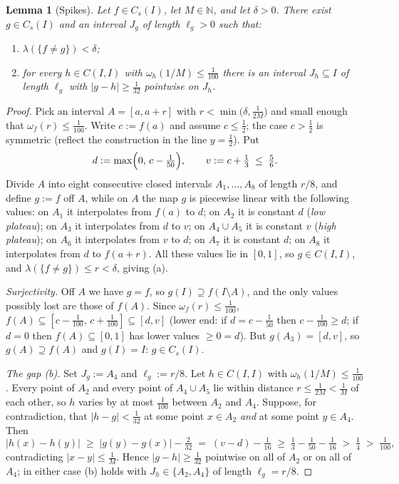 ﻿\documentclass[11pt]{article}
\newtheorem{lemma}[theorem]{Lemma}
\newcommand{\I}{I}
\newcommand{\Cs}{C_s(\I)}
\newcommand{\CI}{C(\I,\I)}
\begin{document}
\begin{lemma}[Spikes]\label{lem:spike}
Let $f\in\Cs$, let $M\in\mathbb N$, and let $\delta>0$.  There exist
$g\in\Cs$ and an interval $J_g$ of length $\ell_g>0$ such that:
\begin{enumerate}
\item[(a)] $\lambda(\{f\ne g\})<\delta$;
\item[(b)] for every $h\in\CI$ with $\omega_h(1/M)\le\tfrac1{100}$ there is an
interval $J_h\subseteq\I$ of length $\ell_g$ with $|g-h|\ge\tfrac1{32}$
\emph{pointwise} on $J_h$.
\end{enumerate}
\end{lemma}

\begin{proof}
Pick an interval $A=[a,a+r]$ with $r<\min\bigl(\delta,\tfrac1{2M}\bigr)$ and small
enough that $\omega_f(r)\le\tfrac1{100}$.  Write $c:=f(a)$ and assume
$c\le\tfrac12$; the case $c>\tfrac12$ is symmetric (reflect the construction in
the line $y=\tfrac12$).  Put
\[
d:=\max\Bigl(0,\,c-\tfrac1{50}\Bigr),
\qquad
v:=c+\tfrac13\;\le\;\tfrac56 .
\]
Divide $A$ into eight consecutive closed intervals $A_1,\dots,A_8$ of length
$r/8$, and define $g:=f$ off $A$, while on $A$ the map $g$ is piecewise linear
with the following values: on $A_1$ it interpolates from $f(a)$ to $d$; on $A_2$
it is constant $d$ (\emph{low plateau}); on $A_3$ it interpolates from $d$ to
$v$; on $A_4\cup A_5$ it is constant $v$ (\emph{high plateau}); on $A_6$ it
interpolates from $v$ to $d$; on $A_7$ it is constant $d$; on $A_8$ it
interpolates from $d$ to $f(a+r)$.  All these values lie in $[0,1]$, so
$g\in\CI$, and $\lambda(\{f\ne g\})\le r<\delta$, giving (a).

\emph{Surjectivity.}  Off $A$ we have $g=f$, so
$g(\I)\supseteq f(\I\setminus A)$, and the only values possibly lost are those of
$f(A)$.  Since $\omega_f(r)\le\tfrac1{100}$,
$f(A)\subseteq[c-\tfrac1{100},\,c+\tfrac1{100}]\subseteq[d,v]$
(lower end: if $d=c-\tfrac1{50}$ then $c-\tfrac1{100}\ge d$; if $d=0$ then
$f(A)\subseteq[0,1]$ has lower values $\ge0=d$).  But $g(A_3)=[d,v]$, so
$g(A)\supseteq f(A)$ and $g(\I)=\I$: $g\in\Cs$.

\emph{The gap (b).}  Set $J_g:=A_4$ and $\ell_g:=r/8$.  Let $h\in\CI$ with
$\omega_h(1/M)\le\tfrac1{100}$.  Every point of $A_2$ and every point of
$A_4\cup A_5$ lie within distance $r\le\tfrac1{2M}<\tfrac1M$ of each other, so
$h$ varies by at most $\tfrac1{100}$ between $A_2$ and $A_4$.  Suppose, for
contradiction, that $|h-g|<\tfrac1{32}$ at some point $x\in A_2$ \emph{and} at
some point $y\in A_4$.  Then
\[
|h(x)-h(y)|\;\ge\;|g(y)-g(x)|-\tfrac2{32}
\;=\;(v-d)-\tfrac1{16}
\;\ge\;\tfrac13-\tfrac1{50}-\tfrac1{16}
\;>\;\tfrac14\;>\;\tfrac1{100},
\]
contradicting $|x-y|\le\tfrac1M$.  Hence $|g-h|\ge\tfrac1{32}$ pointwise on all
of $A_2$ or on all of $A_4$; in either case (b) holds with
$J_h\in\{A_2,A_4\}$ of length $\ell_g=r/8$.
\end{proof}
\end{document}
